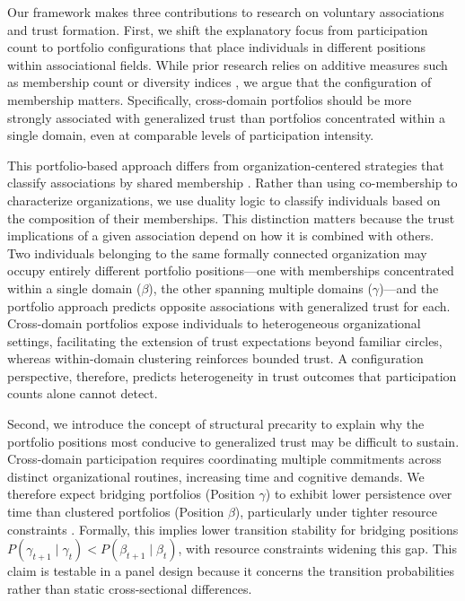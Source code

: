 Our framework makes three contributions to research on voluntary associations and trust formation. First, we shift the explanatory focus from participation count to portfolio configurations that place individuals in different positions within associational fields. While prior research relies on additive measures such as membership count or diversity indices \parencite{glanville_voluntary_2004, paxton_association_2007}, we argue that the configuration of membership matters. Specifically, cross-domain portfolios should be more strongly associated with generalized trust than portfolios concentrated within a single domain, even at comparable levels of participation intensity.

This portfolio-based approach differs from organization-centered strategies that classify associations by shared membership \parencite{paxton_association_2007}. Rather than using co-membership to characterize organizations, we use duality logic to classify individuals based on the composition of their memberships. This distinction matters because the trust implications of a given association depend on how it is combined with others. Two individuals belonging to the same formally connected organization may occupy entirely different portfolio positions---one with memberships concentrated within a single domain ($\beta$), the other spanning multiple domains ($\gamma$)---and the portfolio approach predicts opposite associations with generalized trust for each. Cross-domain portfolios expose individuals to heterogeneous organizational settings, facilitating the extension of trust expectations beyond familiar circles, whereas within-domain clustering reinforces bounded trust. A configuration perspective, therefore, predicts heterogeneity in trust outcomes that participation counts alone cannot detect.

Second, we introduce the concept of structural precarity to explain why the portfolio positions most conducive to generalized trust may be difficult to sustain. Cross-domain participation requires coordinating multiple commitments across distinct organizational routines, increasing time and cognitive demands. We therefore expect bridging portfolios (Position $\gamma$) to exhibit lower persistence over time than clustered portfolios (Position $\beta$), particularly under tighter resource constraints \parencite{mcpherson_social_1992}. Formally, this implies lower transition stability for bridging positions $P(\gamma_{t+1}\mid \gamma_t) < P(\beta_{t+1}\mid \beta_t)$, with resource constraints widening this gap. This claim is testable in a panel design because it concerns the transition probabilities rather than static cross-sectional differences.

